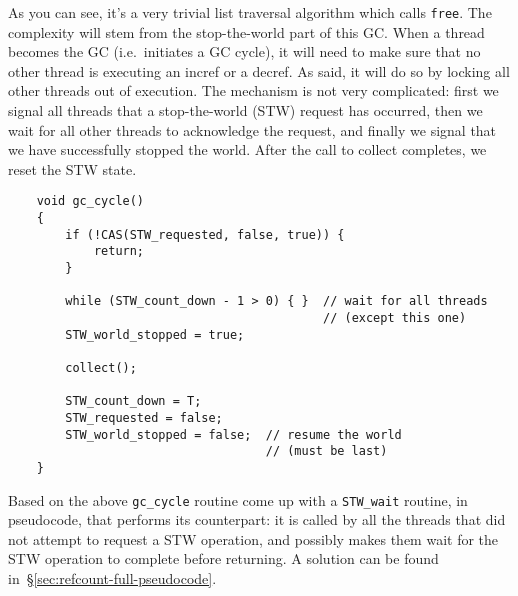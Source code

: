 As you can see, it's a very trivial list traversal algorithm which calls \texttt{free}.
The complexity will stem from the stop-the-world part of this GC\@.
When a thread becomes the GC (i.e.\ initiates a GC cycle), it will need to make sure that no other thread is executing an incref or a decref.
As said, it will do so by locking all other threads out of execution.
The mechanism is not very complicated: first we signal all threads that a stop-the-world (STW) request has occurred, then we wait for all other threads to acknowledge the request, and finally we signal that we have successfully stopped the world.
After the call to collect completes, we reset the STW state.
\begin{verbatim}
	void gc_cycle()
	{
	    if (!CAS(STW_requested, false, true)) {
	        return;
	    }

	    while (STW_count_down - 1 > 0) { }  // wait for all threads
	                                        // (except this one)
	    STW_world_stopped = true;

	    collect();

	    STW_count_down = T;
	    STW_requested = false;
	    STW_world_stopped = false;  // resume the world
	                                // (must be last)
	}
\end{verbatim}

\begin{exercise}
	Based on the above \texttt{gc\_cycle} routine come up with a \texttt{STW\_wait} routine, in pseudocode, that performs its counterpart: it is called by all the threads that did not attempt to request a STW operation, and possibly makes them wait for the STW operation to complete before returning.
	A solution can be found in~\S\ref{sec:refcount-full-pseudocode}.
\end{exercise}

